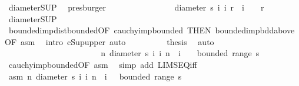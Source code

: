 \begin{isabellebody}
\ diameter{\isacharunderscore}{\kern0pt}SUP\ \isamarkupfalse%
\ presburger\isanewline
\ \ \ \ \ \ \isacommand{{\isacharbraceright}{\kern0pt}}\isamarkupfalse%
\isanewline
\ \ \ \ \ \ \isamarkupfalse%
\ \isamarkupfalse%
\ {\isachardoublequoteopen}diameter\ {\isacharbraceleft}{\kern0pt}s\ i\ {\isacharbar}{\kern0pt}i{\isachardot}{\kern0pt}\ r\ {\isasymle}\ i{\isacharbraceright}{\kern0pt}\ {\isasymge}\ {}{\isachardoublequoteclose}\ \ r\ \isamarkupfalse%
\ diameter{\isacharunderscore}{\kern0pt}SUP\ \isamarkupfalse%
\ bounded{\isacharunderscore}{\kern0pt}imp{\isacharunderscore}{\kern0pt}dist{\isacharunderscore}{\kern0pt}bounded{\isacharbrackleft}{\kern0pt}OF\ cauchy{\isacharunderscore}{\kern0pt}imp{\isacharunderscore}{\kern0pt}bounded{\isacharcomma}{\kern0pt}\ THEN\ bounded{\isacharunderscore}{\kern0pt}imp{\isacharunderscore}{\kern0pt}bdd{\isacharunderscore}{\kern0pt}above{\isacharcomma}{\kern0pt}\ OF\ asm{\isacharbrackright}{\kern0pt}\ \isamarkupfalse%
\ {\isacharparenleft}{\kern0pt}intro\ cSup{\isacharunderscore}{\kern0pt}upper{}{\isacharcomma}{\kern0pt}\ auto{\isacharparenright}{\kern0pt}\isanewline
\ \ \ \ \ \ \isamarkupfalse%
\ \isamarkupfalse%
\ {\isacharquery}{\kern0pt}thesis\ \isamarkupfalse%
\ auto\isanewline
\ \ \ \ \isamarkupfalse%
\ \ \ \ \ \ \ \ \ \ \ \ \ \ \ \ \ \isanewline
\ \ \ \ \isamarkupfalse%
\ {\isachardoublequoteopen}{\isacharparenleft}{\kern0pt}{\isasymlambda}n{\isachardot}{\kern0pt}\ diameter\ {\isacharbraceleft}{\kern0pt}s\ i\ {\isacharbar}{\kern0pt}i{\isachardot}{\kern0pt}\ n\ {\isasymle}\ i{\isacharbraceright}{\kern0pt}{\isacharparenright}{\kern0pt}\ {\isasymlonglonglongrightarrow}\ {}\ {\isasymand}\ bounded\ {\isacharparenleft}{\kern0pt}range\ s{\isacharparenright}{\kern0pt}{\isachardoublequoteclose}\ \isamarkupfalse%
\ cauchy{\isacharunderscore}{\kern0pt}imp{\isacharunderscore}{\kern0pt}bounded{\isacharbrackleft}{\kern0pt}OF\ asm{\isacharbrackright}{\kern0pt}\ \isamarkupfalse%
\ {\isacharparenleft}{\kern0pt}simp\ add{\isacharcolon}{\kern0pt}\ LIMSEQ{\isacharunderscore}{\kern0pt}iff{\isacharparenright}{\kern0pt}\isanewline
\ \ \isamarkupfalse%
\isanewline
\ \ \ \ \isamarkupfalse%
\ asm{\isacharcolon}{\kern0pt}\ {\isachardoublequoteopen}{\isacharparenleft}{\kern0pt}{\isasymlambda}n{\isachardot}{\kern0pt}\ diameter\ {\isacharbraceleft}{\kern0pt}s\ i\ {\isacharbar}{\kern0pt}i{\isachardot}{\kern0pt}\ n\ {\isasymle}\ i{\isacharbraceright}{\kern0pt}{\isacharparenright}{\kern0pt}\ {\isasymlonglonglongrightarrow}\ {}{\isachardoublequoteclose}\ {\isachardoublequoteopen}bounded\ {\isacharparenleft}{\kern0pt}range\ s{\isacharparenright}{\kern0pt}{\isachardoublequoteclose}\isanewline

\end{isabellebody}
